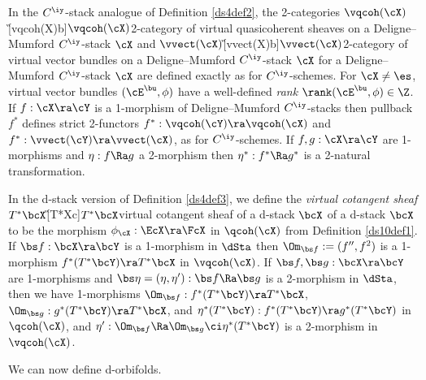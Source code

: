\documentclass{article}
\begin{document}
\begin{rem} In the $C^\iy$-stack analogue of Definition
\ref{ds4def2}, the 2-categories
$\vqcoh(\cX)$\G[vqcoh(X)b]{$\vqcoh(\cX)$}{2-category of virtual
quasicoherent sheaves on a Deligne--Mumford $C^\iy$-stack $\cX$} and
$\vvect(\cX)$\G[vvect(X)b]{$\vvect(\cX)$}{2-category of virtual
vector bundles on a Deligne--Mumford $C^\iy$-stack $\cX$} for a
Deligne--Mumford $C^\iy$-stack $\cX$ are defined exactly as for
$C^\iy$-schemes. For $\cX\ne\es$, virtual vector bundles
$(\cE^\bu,\phi)$ have a well-defined {\it rank\/}
$\rank(\cE^\bu,\phi)\in\Z$. If $f:\cX\ra\cY$ is a 1-morphism of
Deligne--Mumford $C^\iy$-stacks then pullback $f^*$ defines strict
2-functors $f^*:\vqcoh(\cY)\ra
\vqcoh(\cX)$ and $f^*:\vvect(\cY)\ra \vvect(\cX)$, as for
$C^\iy$-schemes. If $f,g:\cX\ra\cY$ are 1-morphisms and $\eta:f\Ra
g$ a 2-morphism then $\eta^*:f^*\Ra g^*$ is a 2-natural
transformation.

In the d-stack version of Definition \ref{ds4def3}, we define the
{\it virtual cotangent sheaf\/} $T^*\bcX$\G[T*Xc]{$T^*\bcX$}{virtual
cotangent sheaf of a d-stack $\bcX$} of a d-stack $\bcX$ to be the morphism $\phi_\cX:\EcX\ra\FcX$
in $\qcoh(\cX)$ from Definition \ref{ds10def1}. If $\bs
f:\bcX\ra\bcY$ is a 1-morphism in $\dSta$ then $\Om_{\bs
f}:=(f'',f^2)$ is a 1-morphism $f^*(T^*\bcY)\ra T^*\bcX$ in
$\vqcoh(\cX)$. If $\bs f,\bs g:\bcX\ra\bcY$ are 1-morphisms and
$\bs\eta=(\eta,\eta'):\bs f\Ra\bs g$ is a 2-morphism in $\dSta$,
then we have 1-morphisms $\Om_{\bs f}:f^*(T^*\bcY)\ra T^*\bcX$,
$\Om_{\bs g}:g^*(T^*\bcY)\ra T^*\bcX$, and
$\eta^*(T^*\bcY):f^*(T^*\bcY)\ra g^*(T^*\bcY)$ in $\qcoh(\cX)$, and
$\eta':\Om_{\bs f}\Ra\Om_{\bs g}\ci\eta^*(T^*\bcY)$ is a 2-morphism
in~$\vqcoh(\cX)$.
\label{ds11rem}
\end{rem}

We can now define d-orbifolds.
\end{document}

